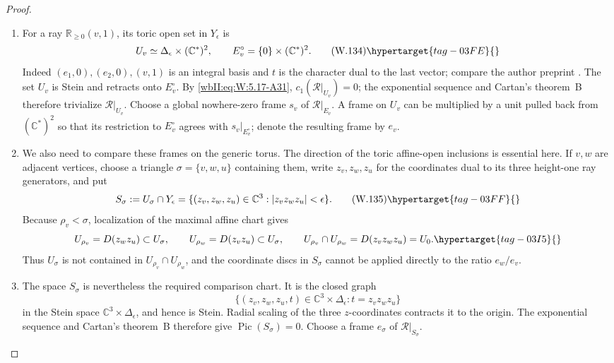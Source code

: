 \begin{proof}
\begin{enumerate}[label={$\langle1\rangle$\arabic*.},leftmargin=*]
\item For a ray \(\mathbb R_{\ge0}(v,1)\), its toric open set in
\(Y_\epsilon\) is
\[
 U_v\simeq\Delta_\epsilon\times(\mathbb C^*)^2,
 \qquad E_v^\circ=\{0\}\times(\mathbb C^*)^2.
\tag{W.134}\hypertarget{tag-03FE}{}\label{wbII:eq:W:5.17-A34}
\]
Indeed \((e_1,0),(e_2,0),(v,1)\) is an integral basis and \(t\) is the
character dual to the last vector; compare the author preprint
\cite[Example~1.2.21, p.~31]{CoxLittleSchenck2011}.
The set \(U_v\) is Stein and retracts
onto \(E_v^\circ\).  By \eqref{wbII:eq:W:5.17-A31},
\(c_1(\mathcal R|_{U_v})=0\); the exponential sequence and Cartan's
theorem~B therefore trivialize \(\mathcal R|_{U_v}\).  Choose a global
nowhere-zero frame \(s_v\) of \(\mathcal R|_{E_v}\).  A frame on \(U_v\) can be
multiplied by a unit pulled back from \((\mathbb C^*)^2\) so that its
restriction to \(E_v^\circ\) agrees with \(s_v|_{E_v^\circ}\); denote the
resulting frame by \(e_v\).

\item We also need to compare these frames on the generic torus.  The direction
of the toric affine-open inclusions is essential here.  If \(v,w\) are
adjacent vertices, choose a triangle \(\sigma=\{v,w,u\}\) containing them,
write \(z_v,z_w,z_u\) for the coordinates dual to its three height-one ray
generators, and put
\[
 S_\sigma:=U_\sigma\cap Y_\epsilon
 =\{(z_v,z_w,z_u)\in\mathbb C^3:
       |z_vz_wz_u|<\epsilon\}.
\tag{W.135}\hypertarget{tag-03FF}{}\label{wbII:eq:W:5.17-A34a}
\]
Because \(\rho_v<\sigma\), localization of the maximal affine chart gives
\begin{equation}
 U_{\rho_v}=D(z_wz_u)\subset U_\sigma,\qquad
 U_{\rho_w}=D(z_vz_u)\subset U_\sigma,\qquad
 U_{\rho_v}\cap U_{\rho_w}=D(z_vz_wz_u)=U_0.
\hypertarget{tag-03I5}{}\label{wbII:eq:analytic-toric-open-directions}
\end{equation}
Thus \(U_\sigma\) is not contained in \(U_{\rho_v}\cap U_{\rho_w}\), and
the coordinate discs in \(S_\sigma\) cannot be applied directly to the
ratio \(e_w/e_v\).

\item The space \(S_\sigma\) is nevertheless the required comparison chart.  It
is the closed graph
\[
 \{(z_v,z_w,z_u,t)\in\mathbb C^3\times\Delta_\epsilon:
   t=z_vz_wz_u\}
\]
in the Stein space \(\mathbb C^3\times\Delta_\epsilon\), and hence is
Stein.  Radial scaling of the three \(z\)-coordinates contracts it to the
origin.  The exponential sequence and Cartan's theorem~B therefore give
\(\operatorname{Pic}(S_\sigma)=0\).  Choose a frame \(e_\sigma\) of
\(\mathcal R|_{S_\sigma}\).


\end{enumerate}
\end{proof}
